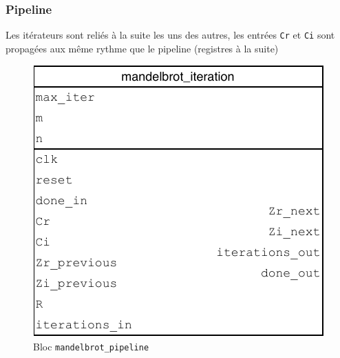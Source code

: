 \documentclass[LPSC_Labo03_SDeriaz]{subfiles}
\begin{document}
\subsubsection{Pipeline}
Les itérateurs sont reliés à la suite les uns des autres, les entrées \verb!Cr! et \verb!Ci! sont propagées aux même rythme que le pipeline (registres à la suite)
\begin{figure}[H]
\centering
\includegraphics[width=\textwidth,page=3]{../Documents/Schemas-crop.pdf}
\caption[caption]{Bloc \texttt{mandelbrot\_pipeline}}
\end{figure}
\end{document}
